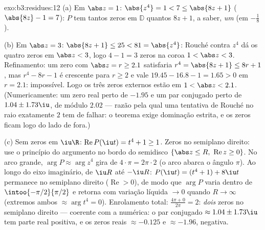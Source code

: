 \begin{solution}{exo:b3:residues:12}
(a) Em $\abs z = 1$: $\abs{z^4} = 1 < 7 \leq \abs{8z + 1}$
($\abs{8z} - 1 = 7$): $P$ tem tantos zeros em $\mathbb D$
quantos $8z + 1$, a saber, \emph{um} (em $-\frac18$).

(b) Em $\abs z = 3$: $\abs{8z + 1} \leq 25 < 81 =
\abs{z^4}$: Rouché contra $z^4$ dá os quatro zeros em
$\abs z < 3$, logo $4 - 1 = 3$ zeros na coroa $1 <
\abs z < 3$. Refinamento: um zero com $\abs z = r \geq 2.1$
satisfaria $r^4 = \abs{8z + 1} \leq 8r + 1$, mas $r^4 -
8r - 1$ é crescente para $r \geq 2$ e vale $19.45 -
16.8 - 1 = 1.65 > 0$ em $r = 2.1$: impossível. Logo os três
zeros externos estão em $1 < \abs z < 2.1$. (Numericamente: um zero real
perto de $-1.95$ e um par conjugado perto de $1.04 \pm
1.73\iu$, de módulo $2.02$ --- razão pela qual uma tentativa de Rouché
no raio exatamente $2$ tem de falhar: o teorema exige
dominação estrita, e os zeros ficam logo do lado de fora.)

(c) Sem zeros em $\iu\R$: $\operatorname{Re}P(\iu t) = t^4 +
1 \geq 1$. Zeros no semiplano direito: use o princípio do
argumento no bordo do semidisco $\{\abs z \leq
R,\ \operatorname{Re}z \geq 0\}$. No arco grande, $\arg P
\approx \arg z^4$ gira de $4\cdot\pi = 2\pi\cdot2$ (o
arco abarca o ângulo $\pi$). Ao longo do eixo imaginário, de
$\iu R$ até $-\iu R$: $P(\iu t) = (t^4 + 1) + 8\iu t$
permanece no semiplano direito ($\operatorname{Re} > 0$), de modo que
$\arg P$ varia dentro de $\intoo{-\pi/2}{\pi/2}$ e retorna
com variação líquida $\to 0$ quando $R \to \infty$ (extremos ambos
$\approx \arg t^4 = 0$). Enrolamento total: $\frac{4\pi + 0}
{2\pi} = 2$: \emph{dois} zeros no semiplano direito ---
coerente com a numérica: o par conjugado $\approx
1.04 \pm 1.73\iu$ tem parte real positiva, e os zeros reais
$\approx -0.125$ e $\approx -1.96$, negativa.
\end{solution}

